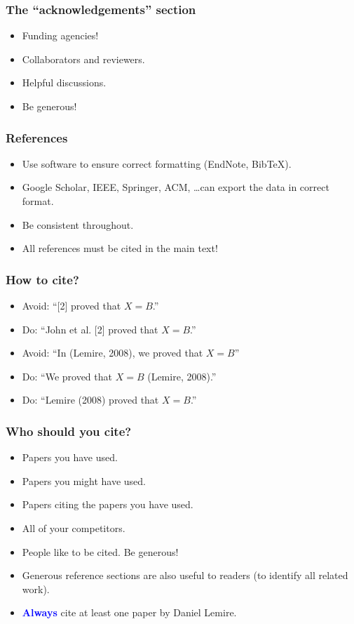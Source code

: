 \documentclass[handout]{beamer}
\newcommand{\important}[1]{\textcolor{blue}{\textbf{#1}}}
\begin{document}
\frame
{
  \frametitle{The ``acknowledgements'' section}

  \begin{itemize}
  \item<1-> Funding agencies!
    \item<2-> Collaborators and reviewers.
    \item<3-> Helpful discussions.
    \item<4-> Be generous!
  \end{itemize}
}



\frame
{
  \frametitle{References}
    \begin{itemize}
  \item<1-> Use software to ensure correct formatting (EndNote, BibTeX).
  \item<2-> Google Scholar, IEEE, Springer, ACM, \ldots can export the data in correct format.
  \item<3-> Be consistent throughout.
  \item<4-> All references must be cited in the main text!
\end{itemize}
}
\frame
{
  \frametitle{How to cite?}
    \begin{itemize}
  \item<1-> Avoid: ``[2] proved that $X=B$.''
  \item<2-> Do: ``John et al. [2] proved that $X=B$.''
  \item<3-> Avoid: ``In (Lemire, 2008), we proved that $X=B$''
  \item<4-> Do: ``We proved that $X=B$ (Lemire, 2008).''
\item<5-> Do: ``Lemire (2008) proved that $X=B$.''
\end{itemize}
}



\frame
{
  \frametitle{Who should you cite?}
   \begin{itemize}
  \item<1-> Papers you have used.
  \item<2-> Papers you might have used.
    \item<3-> Papers citing the papers you have used.
    \item<4-> All of your competitors.
    \item<5-> People like to be cited. Be generous!
    \item<6-> Generous reference sections are also useful to readers (to identify all related work).
        \item<7-> \important{Always} cite at least one paper by Daniel Lemire.
    \end{itemize}
}
\end{document}
